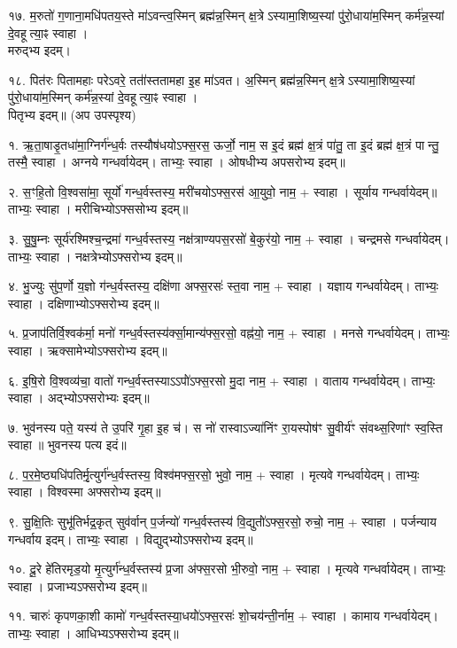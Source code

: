 १७. म॒रुतो॑ ग॒णाना॒मधि॑पतय॒स्ते मा॑ऽवन्त्व॒स्मिन् ब्रह्म॑न्न॒स्मिन् क्ष॒त्रेऽस्यामा॒शिष्य॒स्यां पु॑रो॒धाया॑म॒स्मिन् कर्म॑न्न॒स्यां दे॒वहूत्या॒ꣴ स्वाहा।\\
मरुद्भ्य इदम्।

१८. पित॑रः पितामहाः परेऽवरे॒ तता॑॑स्ततामहा इ॒ह मा॑ऽवत। अ॒स्मिन् ब्रह्म॑न्न॒स्मिन् क्ष॒त्रेऽस्यामा॒शिष्य॒स्यां पु॑रो॒धाया॑म॒स्मिन् कर्म॑न्न॒स्यां दे॒वहूत्या॒ꣴ स्वाहा।\\
पितृभ्य इदम्॥ (अप उपस्पृश्य)


१. ऋ॒ता॒षाडृ॒तधा॑मा॒ग्निर्ग॑न्ध॒र्वः तस्यौष॑धयोऽफ्स॒रस॒ ऊर्जो॒ नाम॒
स इ॒दं ब्रह्म॑ क्ष॒त्रं पा॑तु॒ ता इ॒दं ब्रह्म॑ क्ष॒त्रं पान्तु॒ तस्मै॒ स्वाहा। 
अग्नये गन्धर्वायेदम्। ताभ्यः॒ स्वाहा। ओषधीभ्य अपसरोभ्य इदम्॥

२. स॒ꣳहि॒तो वि॒श्वसा॑मा॒ सूर्यो॑ गन्ध॒र्वस्तस्य॒ मरी॑चयोऽफ्स॒रस॑ आ॒युवो॒ नाम॒ + स्वाहा।
सूर्याय गन्धर्वायेदम्॥ ताभ्यः॒ स्वाहा। मरीचिभ्योऽफ्ससोभ्य इदम्॥

३. सु॒षु॒म्नः सूर्य॑रश्मिश्च॒न्द्रमा॑ गन्ध॒र्वस्तस्य॒ नक्ष॑त्राण्यपस॒रसो॑ बे॒कुर॑यो॒ नाम॒ + स्वाहा।
चन्द्रमसे गन्धर्वायेदम्। ताभ्यः॒ स्वाहा। नक्षत्रेभ्योऽफ्सरोभ्य इदम्॥

४. भु॒ज्युः सु॑प॒र्णो य॒ज्ञो ग॑न्ध॒र्वस्तस्य॒ दक्षि॑णा अफ्स॒रसः॑ स्त॒वा नाम॒ + स्वाहा।
यज्ञाय गन्धर्वायेदम्। ताभ्यः॒ स्वाहा। दक्षिणाभ्योऽफ्सरोभ्य इदम्॥

५. प्र॒जाप॑तिर्वि॒श्वक॑र्मा॒ मनो॑ गन्ध॒र्वस्तस्य॑र्क्सा॒मान्य॑फ्स॒रसो॒ वह्न॑यो॒ नाम॒ + स्वाहा।
मनसे गन्धर्वायेदम्। ताभ्यः॒ स्वाहा। ऋक्सामेभ्योऽफ्सरोभ्य इदम्॥

६. इ॒षि॒रो वि॒श्वव्य॑चा॒ वातो॑ गन्ध॒र्वस्तस्याऽऽपो॑॑ऽफ्स॒रसो मु॒दा नाम॒ + स्वाहा।
वाताय गन्धर्वायेदम्। ताभ्यः॒ स्वाहा। अद्भ्योऽफ्सरोभ्यः इदम्॥

७. भुव॑नस्य पते॒ यस्य॑ ते उ॒परि॑ गृ॒हा इ॒ह च॑।
स नो॑ रास्वाऽज्या॑निंꣳ रा॒यस्पोष॑ꣳ सु॒वीर्य॑ꣳ संवथ्स॒रिणा॑ꣳ स्व॒स्ति स्वाहा॥ भुवनस्य पत्य इदं॥

८. प॒र॒मे॒ष्ठ्यधि॑पतिर्मृ॒त्युर्ग॑न्ध॒र्वस्तस्य॒ विश्व॑मफ्स॒रसो॒ भुवो॒ नाम॒ + स्वाहा।
मृत्यवे गन्धर्वायेदम्। ताभ्यः॒ स्वाहा। विश्वस्मा अफ्सरोभ्य इदम्॥

९. सु॒क्षि॒तिः सुभू॑तिर्भद्र॒कृत् सुव॑र्वान् प॒र्जन्यो॑ गन्ध॒र्वस्तस्य॑ वि॒द्युतो॑॑ऽफ्स॒रसो॒ रुचो॒ नाम॒ + स्वाहा। पर्जन्याय गन्धर्वाय इदम्। ताभ्यः॒ स्वाहा। विद्युद्भ्योऽफ्सरोभ्य इदम्॥

१०. दू॒रे हे॑तिरमृड॒यो मृ॒त्युर्ग॑न्ध॒र्वस्तस्य॑ प्र॒जा अ॑फ्स॒रसो भी॒रुवो॒ नाम॒ + स्वाहा।
मृत्यवे गन्धर्वायेदम्। ताभ्यः॒ स्वाहा। प्रजाभ्यऽफ्सरोभ्य इदम्॥

११. चारुः॑ कृपणका॒शी कामो॑ गन्ध॒र्वस्तस्या॒धयो॑॑ऽफ्स॒रसः॑ शो॒चय॑न्ती॒र्नाम॒ + स्वाहा।
कामाय गन्धर्वायेदम्। ताभ्यः॒ स्वाहा। आधिभ्यऽफ्सरोभ्य इदम्॥

